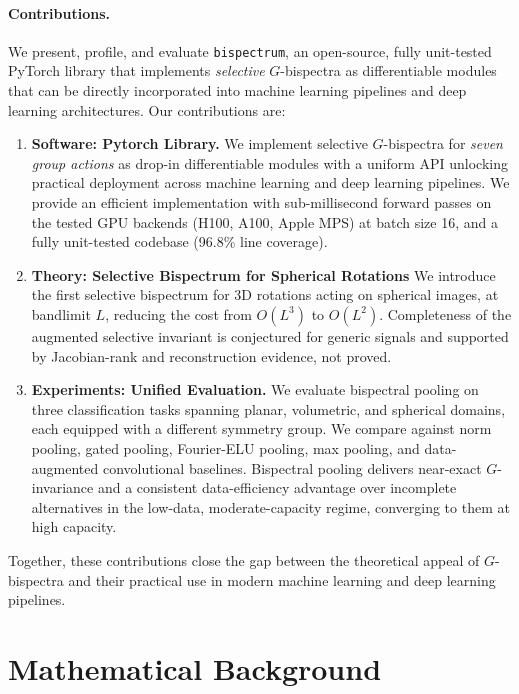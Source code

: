 \documentclass{article}
\theoremstyle{definition}
\theoremstyle{remark}
\theoremstyle{definition}
\begin{document}
\paragraph{Contributions.} We present, profile, and evaluate \texttt{bispectrum}, an open-source, fully unit-tested
PyTorch library that implements \emph{selective} $G$-bispectra as differentiable modules that can be directly incorporated into machine learning pipelines and deep learning architectures. Our contributions are:
\begin{enumerate}[leftmargin=*]
  \item \textbf{Software: Pytorch Library.} We implement selective
    $G$-bispectra for \emph{seven group actions} as drop-in differentiable modules with a
    uniform API unlocking practical deployment across machine learning and deep learning pipelines. We provide an efficient implementation with sub-millisecond forward passes on the tested GPU backends (H100, A100, Apple MPS) at batch size 16, and a fully unit-tested codebase (96.8\% line coverage).
  \item \textbf{Theory: Selective Bispectrum for Spherical Rotations}
    We introduce the first selective bispectrum for 3D rotations acting on spherical images, at bandlimit $L$, reducing the cost from $O(L^3)$ to $O(L^2)$. Completeness of the augmented selective invariant is conjectured for generic signals and supported by Jacobian-rank and reconstruction evidence, not proved.
 \item \textbf{Experiments: Unified Evaluation.} We evaluate bispectral
  pooling on three classification tasks spanning planar, volumetric, and
  spherical domains, each equipped with a different symmetry group. We
  compare against norm pooling, gated pooling, Fourier-ELU pooling, max
  pooling, and data-augmented convolutional baselines. Bispectral pooling delivers
  near-exact $G$-invariance and a consistent data-efficiency
  advantage over incomplete alternatives in the low-data,
  moderate-capacity regime, converging to them at high capacity.
\end{enumerate}

Together, these contributions close the gap between the theoretical appeal of $G$-bispectra and their practical use in modern machine learning and deep learning pipelines.

\section{Mathematical Background}
\label{sec:background}
\end{document}
